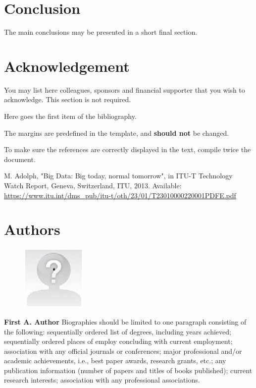 \documentclass[10pt,a4paper,twocolumn]{article}
\newcommand{\ITUurl}[1]{\textcolor{blue}{\urlstyle{same}\url{#1}}}
\newcommand{\ITUpar}{\vspace{8pt}\par}
\begin{document}
\section{Conclusion}
\label{sec:sec11}
The main conclusions may be presented in a short final section.


\section*{Acknowledgement}
\label{sec:ackn}
You may list here colleagues, sponsors and financial supporter that you wish to acknowledge.
This section is not required.


\begin{thebibliography}{9}

Here goes the first item of the bibliography.

The margins are predefined in the template, and \textbf{should not} be changed.

To make sure the references are correctly displayed in the text, compile twice the document.

M. Adolph,
"Big Data: Big today, normal tomorrow",
in ITU-T Technology Watch Report,
Geneva, Switzerland, ITU, 2013. Available:
{\ITUurl{https://www.itu.int/dms_pub/itu-t/oth/23/01/T23010000220001PDFE.pdf}}

\end{thebibliography}

\newpage
\section*{Authors}
\label{sec:auth}

\begin{figure} 
    \vspace{-.1in}
    \includegraphics[width=0.39\columnwidth]{yourphotofilename.jpg} 
\end{figure}\textbf{First A. Author} Biographies should be limited to one paragraph consisting of the following: sequentially ordered list of degrees, including years achieved; sequentially ordered places of employ concluding with current employment; association with any official journals or conferences; major professional and/or academic achievements, i.e., best paper awards, research grants, etc.; any publication information (number of papers and titles of books published); current research interests; association with any professional associations.\ITUpar
\end{document}
